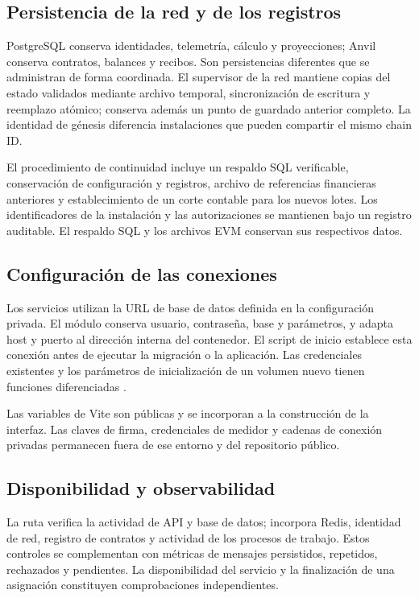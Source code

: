 \subsection{Persistencia de la red y de los registros}
PostgreSQL conserva identidades, telemetría, cálculo y proyecciones; Anvil conserva contratos, balances y recibos. Son persistencias diferentes que se administran de forma coordinada. El supervisor de la red mantiene copias del estado validados mediante archivo temporal, sincronización de escritura y reemplazo atómico; conserva además un punto de guardado anterior completo. La identidad de génesis diferencia instalaciones que pueden compartir el mismo chain ID.

El procedimiento de continuidad incluye un respaldo SQL verificable, conservación de configuración y registros, archivo de referencias financieras anteriores y establecimiento de un corte contable para los nuevos lotes. Los identificadores de la instalación y las autorizaciones se mantienen bajo un registro auditable. El respaldo SQL y los archivos EVM conservan sus respectivos datos.

\subsection{Configuración de las conexiones}
Los servicios utilizan la URL de base de datos definida en la configuración privada. El módulo  conserva usuario, contraseña, base y parámetros, y adapta host y puerto al dirección interna del contenedor. El script de inicio establece esta conexión antes de ejecutar la migración o la aplicación. Las credenciales existentes y los parámetros de inicialización de un volumen nuevo tienen funciones diferenciadas \citep{config}.

Las variables de Vite son públicas y se incorporan a la construcción de la interfaz. Las claves de firma, credenciales de medidor y cadenas de conexión privadas permanecen fuera de ese entorno y del repositorio público.

\subsection{Disponibilidad y observabilidad}
La ruta  verifica la actividad de API y base de datos;  incorpora Redis, identidad de red, registro de contratos y actividad de los procesos de trabajo. Estos controles se complementan con métricas de mensajes persistidos, repetidos, rechazados y pendientes. La disponibilidad del servicio y la finalización de una asignación constituyen comprobaciones independientes.

